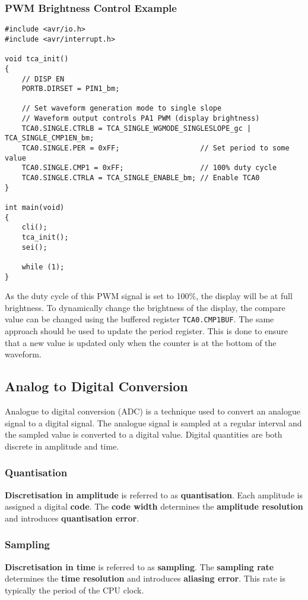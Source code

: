 \documentclass{article}
\begin{document}
\subsubsection{PWM Brightness Control Example}
\begin{verbatim}
#include <avr/io.h>
#include <avr/interrupt.h>

void tca_init()
{
    // DISP EN
    PORTB.DIRSET = PIN1_bm;

    // Set waveform generation mode to single slope
    // Waveform output controls PA1 PWM (display brightness)
    TCA0.SINGLE.CTRLB = TCA_SINGLE_WGMODE_SINGLESLOPE_gc | TCA_SINGLE_CMP1EN_bm;
    TCA0.SINGLE.PER = 0xFF;                   // Set period to some value
    TCA0.SINGLE.CMP1 = 0xFF;                  // 100% duty cycle
    TCA0.SINGLE.CTRLA = TCA_SINGLE_ENABLE_bm; // Enable TCA0
}

int main(void)
{
    cli();
    tca_init();
    sei();

    while (1);
}
\end{verbatim}
As the duty cycle of this PWM signal is set to 100\%, the display will
be at full brightness. To dynamically change the brightness of the
display, the compare value can be changed using the buffered register
\texttt{TCA0.CMP1BUF}. The same approach should be used to
update the period register. This is done to ensure that a new value is
updated only when the counter is at the bottom of the waveform.
\subsection{Analog to Digital Conversion}
Analogue to digital conversion (ADC) is a technique used to convert an
analogue signal to a digital signal. The analogue signal is sampled at
a regular interval and the sampled value is converted to a digital
value. Digital quantities are both discrete in amplitude and time.
\subsubsection{Quantisation}
\textbf{Discretisation in amplitude} is referred to as
\textbf{quantisation}. Each amplitude is assigned a digital
\textbf{code}. The \textbf{code width} determines the \textbf{amplitude
resolution} and introduces \textbf{quantisation error}.
\subsubsection{Sampling}
\textbf{Discretisation in time} is referred to as \textbf{sampling}. The
\textbf{sampling rate} determines the \textbf{time resolution} and
introduces \textbf{aliasing error}. This rate is typically the period of
the CPU clock.
\end{document}
